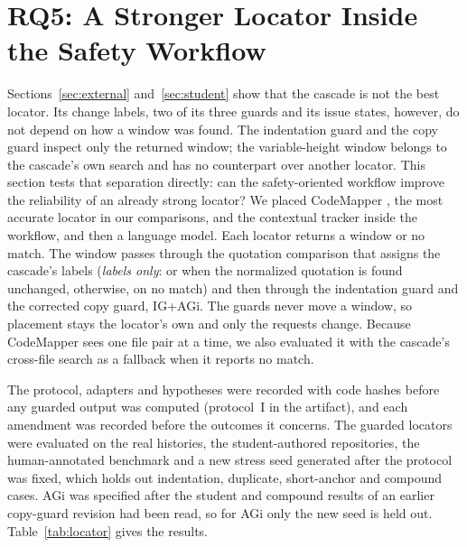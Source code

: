 \section{RQ5: A Stronger Locator Inside the Safety Workflow}\label{sec:locator}
Sections~\ref{sec:external} and~\ref{sec:student} show that the cascade is not the best locator. Its change labels, two of its three guards and its issue states, however, do not depend on how a window was found. The indentation guard and the copy guard inspect only the returned window; the variable-height window belongs to the cascade's own search and has no counterpart over another locator. This section tests that separation directly: can the safety-oriented workflow improve the reliability of an already strong locator? We placed CodeMapper \cite{hu2026codemapper}, the most accurate locator in our comparisons, and the contextual tracker inside the workflow, and then a language model. Each locator returns a window or no match. The window passes through the quotation comparison that assigns the cascade's labels (\emph{labels only}:  or  when the normalized quotation is found unchanged,  otherwise,  on no match) and then through the indentation guard and the corrected copy guard, IG+AGi. The guards never move a window, so placement stays the locator's own and only the requests change. Because CodeMapper sees one file pair at a time, we also evaluated it with the cascade's cross-file search as a fallback when it reports no match.

The protocol, adapters and hypotheses were recorded with code hashes before any guarded output was computed (protocol~I in the artifact), and each amendment was recorded before the outcomes it concerns. The guarded locators were evaluated on the real histories, the student-authored repositories, the human-annotated benchmark and a new stress seed generated after the protocol was fixed, which holds out \wiFrN{} indentation, duplicate, short-anchor and compound cases. AGi was specified after the student and compound results of an earlier copy-guard revision had been read, so for AGi only the new seed is held out. Table~\ref{tab:locator} gives the results.



